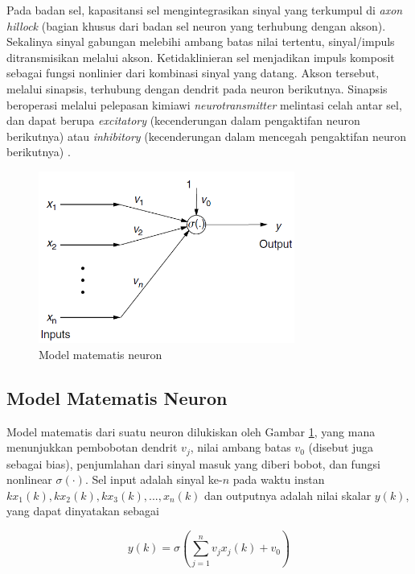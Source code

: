 Pada badan sel, kapasitansi sel mengintegrasikan sinyal yang terkumpul di \textit{axon hillock} (bagian khusus dari badan sel neuron yang terhubung dengan akson). Sekalinya sinyal gabungan melebihi ambang batas nilai tertentu, sinyal/impuls ditransmisikan melalui akson. Ketidaklinieran sel menjadikan impuls komposit sebagai fungsi nonlinier dari kombinasi sinyal yang datang. Akson tersebut, melalui sinapsis, terhubung dengan dendrit pada neuron berikutnya. Sinapsis beroperasi melalui pelepasan kimiawi \textit{neurotransmitter} melintasi celah antar sel, dan dapat berupa \textit{excitatory} (kecenderungan dalam pengaktifan neuron berikutnya) atau \textit{inhibitory} (kecenderungan dalam mencegah pengaktifan neuron berikutnya) \cite{NNControlBook}.

\begin{figure}[!h]
	\centering
	\includegraphics[width=0.75\textwidth]{figures/neuronmath}
	\caption{Model matematis neuron \cite{NNControlBook}}
	\label{fig:3:math}
\end{figure}

\subsection{Model Matematis Neuron}

Model matematis dari suatu neuron dilukiskan oleh Gambar \ref{fig:3:math}, yang mana menunjukkan pembobotan dendrit $v_j$, nilai ambang batas $v_0$ (disebut juga sebagai bias), penjumlahan dari sinyal masuk yang diberi bobot, dan fungsi nonlinear $\sigma(\cdot)$. Sel input adalah sinyal ke-$n$ pada waktu instan 	$kx_1(k), kx_2(k), kx_3(k),...,x_n(k)$ dan outputnya adalah nilai skalar $y(k)$, yang dapat dinyatakan sebagai

\begin{equation} \label{eq:3:perceptron}
y(k) = \sigma \left( \sum_{j=1}^{n}v_jx_j(k)+v_0 \right)
\end{equation}

